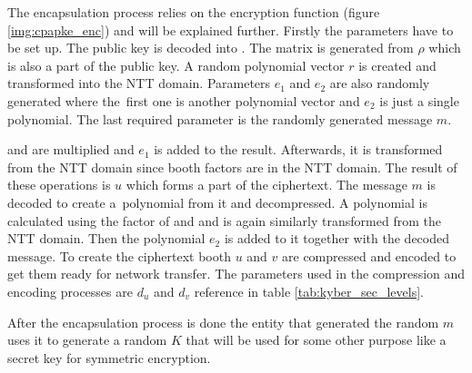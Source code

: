The encapsulation process relies on the encryption function (figure \ref{img:cpapke_enc}) and will be explained further. Firstly the parameters have to be set up. The public key is decoded into . The matrix  is generated from $\rho$ which is also a part of the public key. A random polynomial vector $r$ is created and transformed into the NTT domain. Parameters $e_1$ and $e_2$ are also randomly generated where the~first one is another polynomial vector and $e_2$ is just a single polynomial. The last required parameter is the randomly generated message $m$.

 and  are multiplied and $e_1$ is added to the result. Afterwards, it is transformed from the NTT domain since booth factors are in the NTT domain. The result of these operations is $u$ which forms a part of the ciphertext. The message $m$ is decoded to create a~polynomial from it and decompressed. A polynomial is calculated using the factor of  and  and is again similarly transformed from the NTT domain. Then the polynomial $e_2$ is added to it together with the decoded message. To create the ciphertext booth $u$ and $v$ are compressed and encoded to get them ready for network transfer. The parameters used in the compression and encoding processes are $d_u$ and $d_v$ reference in table \ref{tab:kyber_sec_levels}.

After the encapsulation process is done the entity that generated the random $m$ uses it to generate a random $K$ that will be used for some other purpose like a secret key for symmetric encryption.
